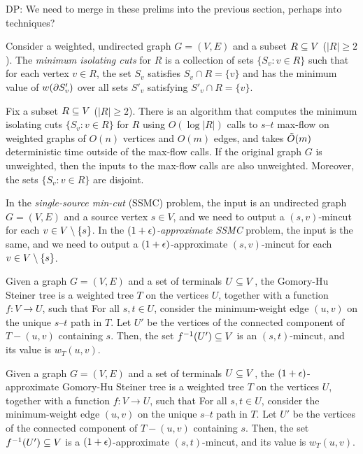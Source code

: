 \alert{DP: We need to merge in these prelims into the previous section, perhaps into techniques?}

Consider a weighted, undirected graph $G=(V,E)$ and a subset $R\subseteq V$ ($|R|\ge2$). The \emph{minimum isolating cuts} for $R$ is a collection of sets $\{S_v:v\in R\}$ such that for each vertex $v\in R$, the set $S_v$ satisfies $S_v\cap R=\{v\}$ and has the minimum value of $w(\partial S'_v)$ over all sets $S'_v$ satisfying $S'_v\cap R=\{v\}$.
\ED


\BL
Fix a subset $R\subseteq V$ ($|R|\ge2$). There is an algorithm that computes the minimum isolating cuts $\{S_v:v\in R\}$ for $R$ using $O(\log|R|)$ calls to $s$--$t$ max-flow on weighted graphs of $O(n)$ vertices and $O(m)$ edges, and takes $\tilde{O}(m)$ deterministic time outside of the max-flow calls. If the original graph $G$ is unweighted, then the inputs to the max-flow calls are also unweighted. Moreover, the sets $\{S_v:v\in R\}$ are disjoint.
\EL


In the \emph{single-source min-cut} (SSMC) problem, the input is an undirected graph $G=(V,E)$ and a source vertex $s\in V$, and we need to output a $(s,v)$-mincut for each $v\in V\setminus \{s\}$. In the \emph{$(1+\epsilon)$-approximate SSMC} problem, the input is the same, and we need to output a $(1+\epsilon)$-approximate $(s,v)$-mincut for each $v\in V\setminus \{s\}$.
\ED


Given a graph $G=(V,E)$ and a set of terminals $U\subseteq V$, the Gomory-Hu Steiner tree is a weighted tree $T$ on the vertices $U$, together with a function $f:V\to U$, such that
 \BI
 \im For all $s,t\in U$, consider the minimum-weight edge $(u,v)$ on the unique $s$--$t$ path in $T$. Let $U'$ be the vertices of the connected component of $T-(u,v)$ containing $s$.
Then, the set $f^{-1}(U')\subseteq V$ is an $(s,t)$-mincut, and its value is $w_T(u,v)$.
 \EI
\ED

Given a graph $G=(V,E)$ and a set of terminals $U\subseteq V$, the $(1+\epsilon)$-approximate Gomory-Hu Steiner tree is a weighted tree $T$ on the vertices $U$, together with a function $f:V\to U$, such that
 \BI
 \im For all $s,t\in U$, consider the minimum-weight edge $(u,v)$ on the unique $s$--$t$ path in $T$. Let $U'$ be the vertices of the connected component of $T-(u,v)$ containing $s$.
Then, the set $f^{-1}(U')\subseteq V$ is a $(1+\epsilon)$-approximate $(s,t)$-mincut, and its value is $w_T(u,v)$.
 \EI
\ED

